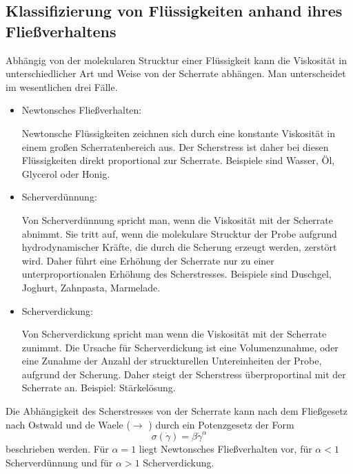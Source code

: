 \documentclass[11pt,a4paper,oneside]{scrartcl}
\begin{document}
\subsection{Klassifizierung von Flüssigkeiten anhand ihres Fließverhaltens}
Abhängig von der molekularen Strucktur einer Flüssigkeit kann die Viskosität in unterschiedlicher Art und Weise von der Scherrate abhängen. Man unterscheidet im wesentlichen drei Fälle.

\begin{itemize}
\item Newtonsches Fließverhalten: 

Newtonsche Flüssigkeiten zeichnen sich durch eine konstante Viskosität in einem großen Scherratenbereich aus. Der Scherstress ist daher bei diesen Flüssigkeiten direkt proportional zur Scherrate. Beispiele
sind Wasser, Öl, Glycerol oder Honig.

\item Scherverdünnung: 

Von Scherverdünnung spricht man, wenn die Viskosität mit der Scherrate abnimmt. Sie tritt auf, wenn die molekulare Strucktur der Probe aufgrund hydrodynamischer Kräfte, die durch die Scherung erzeugt werden,
zerstört wird. Daher führt eine Erhöhung der Scherrate nur zu einer unterproportionalen Erhöhung des Scherstresses. Beispiele sind Duschgel, Joghurt, Zahnpasta, Marmelade.

\item Scherverdickung: 

Von Scherverdickung spricht man wenn die Viskosität mit der Scherrate zunimmt. Die Ursache für Scherverdickung ist eine Volumenzunahme, oder eine Zunahme der Anzahl der struckturellen Untereinheiten der Probe,
aufgrund der Scherung. Daher steigt der Scherstress überproportinal mit der Scherrate an. Beispiel: Stärkelösung.
\end{itemize}
Die Abhängigkeit des Scherstresses von der Scherrate kann nach dem Fließgesetz nach Ostwald und de Waele ($\rightarrow$ \cite{dewiki:192899581}) durch ein Potenzgesetz der Form 
\begin{equation}
\sigma(\dot\gamma)=\beta\dot\gamma^\alpha
\end{equation}
beschrieben werden. Für $\alpha=1$ liegt Newtonsches Fließverhalten vor, für $\alpha<1$ Scherverdünnung und für $\alpha>1$ Scherverdickung.
\end{document}
